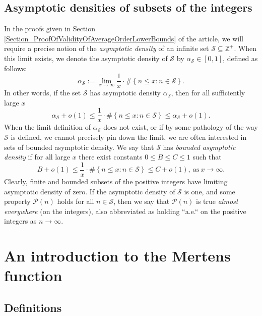 \documentclass[11pt,reqno,a4letter]{article}
\numberwithin{figure}{section}
\numberwithin{table}{section}
\theoremstyle{plain}
\numberwithin{theorem}{section}
\theoremstyle{definition}
\begin{document}
\subsection{Asymptotic densities of subsets of the integers} 

In the proofs given in Section \ref{Section_ProofOfValidityOfAverageOrderLowerBounds} 
of the article, we will require a precise notion of the 
\emph{asymptotic density} of an infinite set $\mathcal{S} \subseteq \mathbb{Z}^{+}$. 
When this limit exists, we denote the asymptotic density of 
$\mathcal{S}$ by $\alpha_{\mathcal{S}} \in [0, 1]$, defined as follows: 
\[
\alpha_{\mathcal{S}} := \lim_{x \rightarrow \infty} \frac{1}{x} \cdot \#\left\{ 
     n \leq x: n \in \mathcal{S} 
     \right\}. 
\]
In other words, if the set $\mathcal{S}$ has asymptotic density $\alpha_{\mathcal{S}}$, then 
for all sufficiently large $x$ 
\[
\alpha_{\mathcal{S}} + o(1) \leq \frac{1}{x} \cdot \#\left\{ 
     n \leq x: n \in \mathcal{S} \right\} \leq 
     \alpha_{\mathcal{S}} + o(1). 
\]
When the limit definition of $\alpha_{\mathcal{S}}$ does not exist, or if by some 
pathology of the way $\mathcal{S}$ is defined, we cannot precisely pin down the limit, we are often 
interested in sets of bounded asymptotic density. We say that $\mathcal{S}$ has 
\emph{bounded asymptotic density} if for all large $x$ there exist constants $0 \leq B \leq C \leq 1$ 
such that 
\[
B + o(1) \leq \frac{1}{x} \cdot \#\left\{ 
     n \leq x: n \in \mathcal{S} \right\} \leq C + o(1), \mathrm{\ as\ } x \rightarrow \infty. 
\]
Clearly, finite and bounded subsets of the positive integers have limiting asymptotic density of zero. 
If the asymptotic density of $\mathcal{S}$ is one, and some property $\mathcal{P}(n)$ holds 
for all $n \in \mathcal{S}$, then we say that $\mathcal{P}(n)$ is true 
\emph{almost everywhere} (on the integers), also abbreviated as holding ``a.e.`` on the positive integers 
as $n \rightarrow \infty$. 

\newpage
\section{An introduction to the Mertens function} 
\label{subSection_MertensMxClassical_Intro} 

\subsection{Definitions} 
\end{document}
